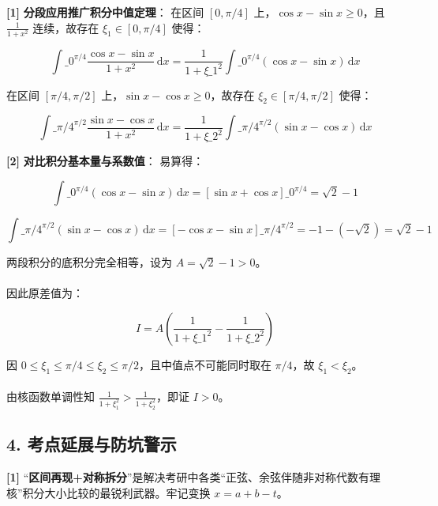 \documentclass[11pt,a4paper,UTF8]{ctexart}
\begin{document}
\begin{solbox}[分步推导与答题规范]
\textbf{[1]}  \textbf{分段应用推广积分中值定理}：
在区间 $[0, \pi/4]$ 上，$\cos x - \sin x \ge 0$，且 $\frac{1}{1+x^2}$ 连续，故存在 $\xi_1 \in [0, \pi/4]$ 使得：

\begin{equation*}
\int\_0^{\pi/4} \frac{\cos x - \sin x}{1+x^2}\,\mathrm{d}x = \frac{1}{1+\xi\_1^2} \int\_0^{\pi/4} (\cos x - \sin x)\,\mathrm{d}x
\end{equation*}

在区间 $[\pi/4, \pi/2]$ 上，$\sin x - \cos x \ge 0$，故存在 $\xi_2 \in [\pi/4, \pi/2]$ 使得：

\begin{equation*}
\int\_{\pi/4}^{\pi/2} \frac{\sin x - \cos x}{1+x^2}\,\mathrm{d}x = \frac{1}{1+\xi\_2^2} \int\_{\pi/4}^{\pi/2} (\sin x - \cos x)\,\mathrm{d}x
\end{equation*}


\textbf{[2]}  \textbf{对比积分基本量与系数值}：
易算得：

\begin{equation*}
\int\_0^{\pi/4} (\cos x - \sin x)\,\mathrm{d}x = [\sin x + \cos x]\_0^{\pi/4} = \sqrt{2} - 1
\end{equation*}


\begin{equation*}
\int\_{\pi/4}^{\pi/2} (\sin x - \cos x)\,\mathrm{d}x = [-\cos x - \sin x]\_{\pi/4}^{\pi/2} = -1 - (-\sqrt{2}) = \sqrt{2} - 1
\end{equation*}

两段积分的底积分完全相等，设为 $A = \sqrt{2} - 1 > 0$。\\ \\
因此原差值为：

\begin{equation*}
I = A \left( \frac{1}{1+\xi\_1^2} - \frac{1}{1+\xi\_2^2} \right)
\end{equation*}

因 $0 \le \xi_1 \le \pi/4 \le \xi_2 \le \pi/2$，且中值点不可能同时取在 $\pi/4$，故 $\xi_1 < \xi_2$。\\ \\
由核函数单调性知 $\frac{1}{1+\xi_1^2} > \frac{1}{1+\xi_2^2}$，即证 $I > 0$。
\end{solbox}


\subsection{4. 考点延展与防坑警示}
\begin{solbox}[分步推导与答题规范]
\textbf{[1]}  “\textbf{区间再现+对称拆分}”是解决考研中各类“正弦、余弦伴随非对称代数有理核”积分大小比较的最锐利武器。牢记变换 $x = a + b - t$。
\end{solbox}
\end{document}
